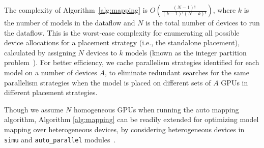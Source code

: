 The complexity of Algorithm~\ref{alg:mapping} 
is $O(\frac{(N-1)!}{(k-1)! (N-k)!})$, where $k$ is the number of models in the dataflow and $N$ is the total number of devices to run the dataflow.
This is the worst-case complexity for enumerating all possible device allocations for a placement strategy (i.e., the standalone placement), calculated by assigning $N$ devices to $k$ models (known as the integer partition problem~\cite{andrews2004integer}). 
For better efficiency, we cache parallelism strategies identified for each model on a number of devices $A$, to eliminate redundant searches for the same parallelism strategies when the model is placed on different sets of $A$ GPUs in different placement strategies. %

Though we assume $N$ homogeneous GPUs when running the auto mapping algorithm, Algorithm \ref{alg:mapping} can be readily extended for optimizing model mapping over heterogeneous devices, by considering heterogeneous devices in \verb|simu| and \verb|auto_parallel| modules~\cite{zhang2024hap}.



